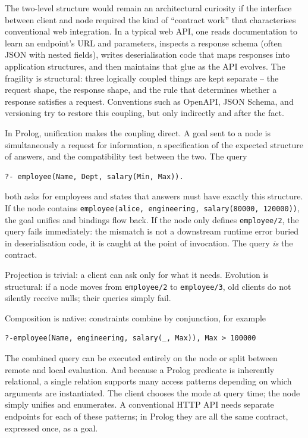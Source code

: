 The two-level structure would remain an architectural curiosity if the interface between client and node required the kind of ``contract work'' that characterises conventional web integration. In a typical web API, one reads documentation to learn an endpoint's URL and parameters, inspects a response schema (often JSON with nested fields), writes deserialisation code that maps responses into application structures, and then maintains that glue as the API evolves. The fragility is structural: three logically coupled things are kept separate -- the request shape, the response shape, and the rule that determines whether a response satisfies a request. Conventions such as OpenAPI, JSON Schema, and versioning try to restore this coupling, but only indirectly and after the fact.

In Prolog, unification makes the coupling direct. A goal sent to a node
is simultaneously a request for information, a specification of the
expected structure of answers, and the compatibility test between the
two. The query

\begin{verbatim}
?- employee(Name, Dept, salary(Min, Max)).
\end{verbatim}

\noindent both asks for employees and states that answers must have
exactly this structure. If the node contains
\texttt{employee(alice,\,engineering,\,salary(80000,\,120000))}, the
goal unifies and bindings flow back. If the node only defines \texttt{employee/2}, the query fails immediately: the mismatch is not a downstream runtime error buried in deserialisation code, it is caught at the point of invocation. The query \emph{is} the contract.

Projection is trivial: a client can ask only for what it needs. Evolution is structural: if a node moves from \texttt{employee/2} to \texttt{employee/3}, old clients do not silently receive nulls; their queries simply fail.

Composition is native: constraints combine by conjunction, for example

\begin{verbatim}
?-employee(Name, engineering, salary(_, Max)), Max > 100000
\end{verbatim}

\noindent The combined query can be executed entirely on the node or split between remote and local evaluation. And because a Prolog predicate is inherently relational,
a single relation supports many access patterns depending on which
arguments are instantiated. The client chooses the mode at query time;
the node simply unifies and enumerates. A conventional HTTP API needs
separate endpoints for each of these patterns; in Prolog they are all
the same contract, expressed once, as a goal.


